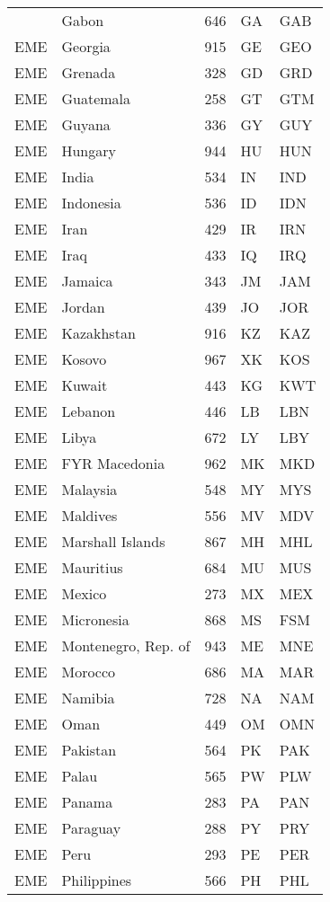 \documentclass[12pt,a4paper]{article}
\begin{document}
\begin{ThreePartTable}
\begin{longtable}
{EME} & Gabon & 646 & GA & GAB \\
{EME} & Georgia & 915 & GE & GEO \\
{EME} & Grenada & 328 & GD & GRD \\
{EME} & Guatemala & 258 & GT & GTM \\
{EME} & Guyana & 336 & GY & GUY \\
{EME} & Hungary & 944 & HU & HUN \\
{EME} & India & 534 & IN & IND \\
{EME} & Indonesia & 536 & ID & IDN \\
{EME} & Iran & 429 & IR & IRN \\
{EME} & Iraq & 433 & IQ & IRQ \\
{EME} & Jamaica & 343 & JM & JAM \\
{EME} & Jordan & 439 & JO & JOR \\
{EME} & Kazakhstan & 916 & KZ & KAZ \\
{EME} & Kosovo & 967 & XK & KOS \\
{EME} & Kuwait & 443 & KG & KWT \\
{EME} & Lebanon & 446 & LB & LBN \\
{EME} & Libya & 672 & LY & LBY \\
{EME} & FYR Macedonia & 962 & MK & MKD \\
{EME} & Malaysia & 548 & MY & MYS \\
{EME} & Maldives & 556 & MV & MDV \\
{EME} & Marshall Islands & 867 & MH & MHL \\
{EME} & Mauritius & 684 & MU & MUS \\
{EME} & Mexico & 273 & MX & MEX \\
{EME} & Micronesia & 868 & MS & FSM \\
{EME} & Montenegro, Rep. of & 943 & ME & MNE \\
{EME} & Morocco & 686 & MA & MAR \\
{EME} & Namibia & 728 & NA & NAM \\
{EME} & Oman & 449 & OM & OMN \\
{EME} & Pakistan & 564 & PK & PAK \\
{EME} & Palau & 565 & PW & PLW \\
{EME} & Panama & 283 & PA & PAN \\
{EME} & Paraguay & 288 & PY & PRY \\
{EME} & Peru & 293 & PE & PER \\
{EME} & Philippines & 566 & PH & PHL \\

\end{longtable}
\end{ThreePartTable}
\end{document}
